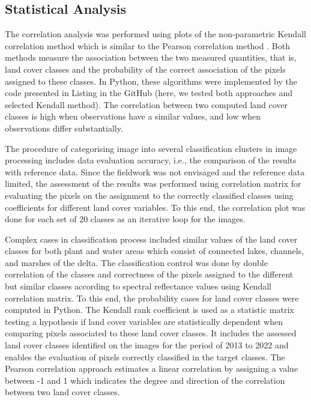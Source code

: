 \documentclass[12pt,a4paper,oneside]{article}
\def \newpar{\vspace{6pt}}
\begin{document}
\subsection*{Statistical Analysis}

\newpar The correlation analysis was performed using plots of the non-parametric Kendall correlation method \citep{Kendall1938} which is similar to the Pearson correlation method \citep{Pearson1895}. Both methods measure the association between the two measured quantities, that is, land cover classes and the probability of the correct association of the pixels assigned to these classes. In Python, these algorithms were implemented by the code presented in Listing in the GitHub (here, we tested both approaches and selected Kendall method). The correlation between two computed land cover classes is high when observations have a similar values, and low when observations differ substantially.

\newpar The procedure of categorising image into several classification clusters in image processing includes data evaluation accuracy, i.e., the comparison of the results with reference data. Since the fieldwork was not envisaged and the reference data limited, the assessment of the results was performed using correlation matrix for evaluating the pixels on the assignment to the correctly classified classes using coefficients for different land cover variables. To this end, the correlation plot was done for each set of 20 classes as an iterative loop for the images.

\newpar Complex cases in classification process included similar values of the land cover classes for both plant and water areas which consist of connected lakes, channels, and marshes of the delta. The classification control was done by double correlation of the classes and correctness of the pixels assigned to the different but similar classes according to spectral reflectance values using Kendall correlation matrix. To this end, the probability cases for land cover classes were computed in Python. The Kendall rank coefficient is used as a statistic matrix testing a hypothesis if land cover variables are statistically dependent when comparing pixels associated to these land cover classes. It includes the assessed land cover classes identified on the images for the period of 2013 to 2022 and enables the evaluation of pixels correctly classified in the target classes. The Pearson correlation approach estimates a linear correlation by assigning a value between -1 and 1 which indicates the degree and direction of the correlation between two land cover classes.
\end{document}
